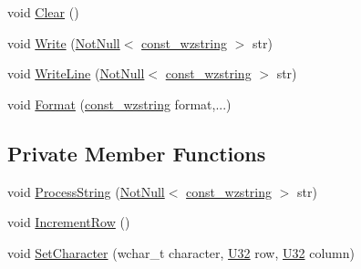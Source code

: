 \begin{DoxyCompactItemize}
\item 
void \mbox{\hyperlink{classmage_1_1script_1_1_text_console_script_a274764deea9f02ec77515680456548d6}{Clear}} ()
\item 
void \mbox{\hyperlink{classmage_1_1script_1_1_text_console_script_a46610edcf7a1707476b87ad64f1ee68d}{Write}} (\mbox{\hyperlink{namespacemage_a8769f9d670d6b585ea306cb1062af94b}{Not\+Null}}$<$ \mbox{\hyperlink{namespacemage_ac409e0f2a22292a3a4cd42742994fbf0}{const\+\_\+wzstring}} $>$ str)
\item 
void \mbox{\hyperlink{classmage_1_1script_1_1_text_console_script_ac8f0361bc1d703b56f1d8be43a32f0ae}{Write\+Line}} (\mbox{\hyperlink{namespacemage_a8769f9d670d6b585ea306cb1062af94b}{Not\+Null}}$<$ \mbox{\hyperlink{namespacemage_ac409e0f2a22292a3a4cd42742994fbf0}{const\+\_\+wzstring}} $>$ str)
\item 
void \mbox{\hyperlink{classmage_1_1script_1_1_text_console_script_ac5a8c33c93acf289ac1cebf2ec9e21d7}{Format}} (\mbox{\hyperlink{namespacemage_ac409e0f2a22292a3a4cd42742994fbf0}{const\+\_\+wzstring}} format,...)
\end{DoxyCompactItemize}
\subsection*{Private Member Functions}
\begin{DoxyCompactItemize}
\item 
void \mbox{\hyperlink{classmage_1_1script_1_1_text_console_script_a9c990e0256f01eb4cc1622bf346f32a5}{Process\+String}} (\mbox{\hyperlink{namespacemage_a8769f9d670d6b585ea306cb1062af94b}{Not\+Null}}$<$ \mbox{\hyperlink{namespacemage_ac409e0f2a22292a3a4cd42742994fbf0}{const\+\_\+wzstring}} $>$ str)
\item 
void \mbox{\hyperlink{classmage_1_1script_1_1_text_console_script_a3d4cba4fd8a2733933a7a444c6beaf1a}{Increment\+Row}} ()
\item 
void \mbox{\hyperlink{classmage_1_1script_1_1_text_console_script_a18bdee79ee6f53e28f90b607c36c8188}{Set\+Character}} (wchar\+\_\+t character, \mbox{\hyperlink{namespacemage_a41c104c036fba3756a74e19f793eeaa1}{U32}} row, \mbox{\hyperlink{namespacemage_a41c104c036fba3756a74e19f793eeaa1}{U32}} column)
\end{DoxyCompactItemize}
